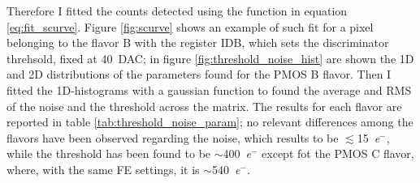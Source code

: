         Therefore I fitted the counts detected using the function in equation \ref{eq:fit_scurve}. Figure \ref{fig:scurve} shows an example of such fit for a pixel belonging to the flavor B with the register IDB, which sets the discriminator threhsold, fixed at \SI{40}{DAC}; in figure \ref{fig:threshold_noise_hist} are shown the 1D and 2D distributions of the parameters found for the PMOS B flavor. Then I fitted the 1D-histograms with a gaussian function to found the average and RMS of the noise and the threshold across the matrix. The results for each flavor are reported in table \ref{tab:threshold_noise_param}; no relevant differences among the flavors have been observed regarding the noise, which results to be $\lesssim$\SI{15}{\elementarycharge}$^-$, while the threshold has been found to be $\sim$\SI{400}{\elementarycharge}$^-$ except fot the PMOS C flavor, where, with the same FE settings, it is $\sim$\SI{540}{\elementarycharge}$^-$.
